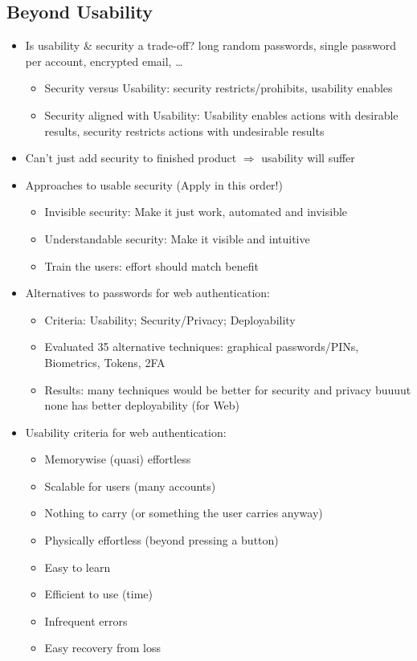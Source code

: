 \documentclass[a4paper,12pt]{scrartcl}
\begin{document}
\subsection{Beyond Usability}
\begin{itemize}
	\item
		Is usability \& security a trade-off? long random passwords, single password per account, encrypted email, \dots
		\begin{itemize}
			\item
				Security versus Usability: security restricts/prohibits, usability enables
			\item
				Security aligned with Usability: Usability enables actions with desirable results, security restricts actions with undesirable results
		\end{itemize}
	\item
		Can't just add security to finished product $\Rightarrow$ usability will suffer
	\item
		Approaches to usable security (Apply in this order!)
		\begin{itemize}
			\item
				Invisible security: Make it just work, automated and invisible
			\item
				Understandable security: Make it visible and intuitive
			\item
				Train the users: effort should match benefit
		\end{itemize}
	\item
		Alternatives to passwords for web authentication:
		\begin{itemize}
			\item
				Criteria: Usability; Security/Privacy; Deployability
			\item
				Evaluated 35 alternative techniques: graphical passwords/PINs, Biometrics, Tokens, 2FA
			\item
				Results: many techniques would be better for security and privacy buuuut none has better deployability (for Web)
		\end{itemize}
	\item
		Usability criteria for web authentication:
		\begin{itemize}
			\item
				Memorywise (quasi) effortless
			\item
				Scalable for users (many accounts)
			\item
				Nothing to carry (or something the user carries anyway)
			\item
				Physically effortless (beyond pressing a button)
			\item
				Easy to learn
			\item
				Efficient to use (time)
			\item
				Infrequent errors
			\item
				Easy recovery from loss
		\end{itemize}


\end{itemize}
\end{document}
